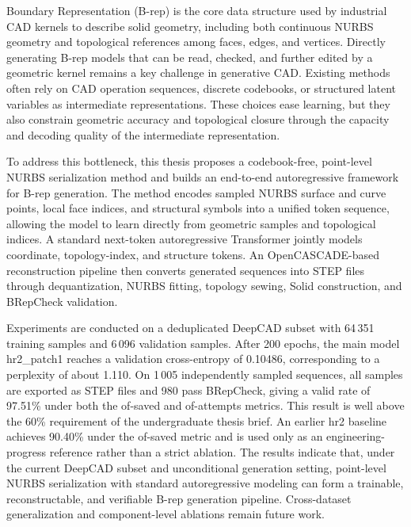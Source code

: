 \begin{engabstract}
    Boundary Representation (B-rep) is the core data structure used by industrial CAD kernels to describe solid geometry, including both continuous NURBS geometry and topological references among faces, edges, and vertices. Directly generating B-rep models that can be read, checked, and further edited by a geometric kernel remains a key challenge in generative CAD. Existing methods often rely on CAD operation sequences, discrete codebooks, or structured latent variables as intermediate representations. These choices ease learning, but they also constrain geometric accuracy and topological closure through the capacity and decoding quality of the intermediate representation.

    To address this bottleneck, this thesis proposes a codebook-free, point-level NURBS serialization method and builds an end-to-end autoregressive framework for B-rep generation. The method encodes sampled NURBS surface and curve points, local face indices, and structural symbols into a unified token sequence, allowing the model to learn directly from geometric samples and topological indices. A standard next-token autoregressive Transformer jointly models coordinate, topology-index, and structure tokens. An OpenCASCADE-based reconstruction pipeline then converts generated sequences into STEP files through dequantization, NURBS fitting, topology sewing, Solid construction, and BRepCheck validation.

    Experiments are conducted on a deduplicated DeepCAD subset with 64\,351 training samples and 6\,096 validation samples. After 200 epochs, the main model hr2\_patch1 reaches a validation cross-entropy of 0.10486, corresponding to a perplexity of about 1.110. On 1\,005 independently sampled sequences, all samples are exported as STEP files and 980 pass BRepCheck, giving a valid rate of 97.51\% under both the of-saved and of-attempts metrics. This result is well above the 60\% requirement of the undergraduate thesis brief. An earlier hr2 baseline achieves 90.40\% under the of-saved metric and is used only as an engineering-progress reference rather than a strict ablation. The results indicate that, under the current DeepCAD subset and unconditional generation setting, point-level NURBS serialization with standard autoregressive modeling can form a trainable, reconstructable, and verifiable B-rep generation pipeline. Cross-dataset generalization and component-level ablations remain future work.
\end{engabstract}
